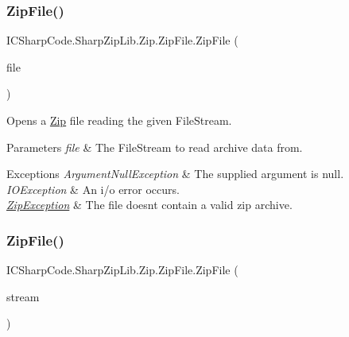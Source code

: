 \subsubsection{\texorpdfstring{Zip\+File()}{ZipFile()}\hspace{0.1cm}{\footnotesize\ttfamily [2/3]}}
{\footnotesize\ttfamily I\+C\+Sharp\+Code.\+Sharp\+Zip\+Lib.\+Zip.\+Zip\+File.\+Zip\+File (\begin{DoxyParamCaption}\item[{File\+Stream}]{file }\end{DoxyParamCaption})\hspace{0.3cm}{\ttfamily [inline]}}



Opens a \hyperlink{namespace_i_c_sharp_code_1_1_sharp_zip_lib_1_1_zip}{Zip} file reading the given File\+Stream. 


\begin{DoxyParams}{Parameters}
{\em file} & The File\+Stream to read archive data from.\\
\hline
\end{DoxyParams}

\begin{DoxyExceptions}{Exceptions}
{\em Argument\+Null\+Exception} & The supplied argument is null.\\
\hline
{\em I\+O\+Exception} & An i/o error occurs. \\
\hline
{\em \hyperlink{class_i_c_sharp_code_1_1_sharp_zip_lib_1_1_zip_1_1_zip_exception}{Zip\+Exception}} & The file doesn\textquotesingle{}t contain a valid zip archive. \\
\hline
\end{DoxyExceptions}
\mbox{\label{class_i_c_sharp_code_1_1_sharp_zip_lib_1_1_zip_1_1_zip_file_aa43c0923b0664d82f6b9cdec2b9efa3d}} 
\subsubsection{\texorpdfstring{Zip\+File()}{ZipFile()}\hspace{0.1cm}{\footnotesize\ttfamily [3/3]}}
{\footnotesize\ttfamily I\+C\+Sharp\+Code.\+Sharp\+Zip\+Lib.\+Zip.\+Zip\+File.\+Zip\+File (\begin{DoxyParamCaption}\item[{Stream}]{stream }\end{DoxyParamCaption})\hspace{0.3cm}{\ttfamily [inline]}}



